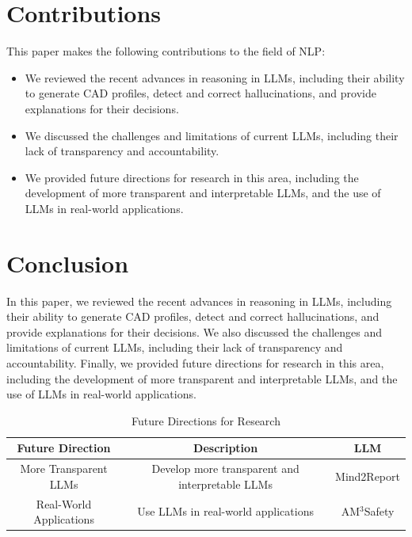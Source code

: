 \documentclass[11pt]{article}
\begin{document}
        \section{Contributions}
        \label{sec:contributions}
        This paper makes the following contributions to the field of NLP:
        \begin{itemize}
        \item We reviewed the recent advances in reasoning in LLMs, including their ability to generate CAD profiles, detect and correct hallucinations, and provide explanations for their decisions.
        \item We discussed the challenges and limitations of current LLMs, including their lack of transparency and accountability.
        \item We provided future directions for research in this area, including the development of more transparent and interpretable LLMs, and the use of LLMs in real-world applications.
        \end{itemize}
        \section{Conclusion}
        \label{sec:conclusion}
        In this paper, we reviewed the recent advances in reasoning in LLMs, including their ability to generate CAD profiles, detect and correct hallucinations, and provide explanations for their decisions. We also discussed the challenges and limitations of current LLMs, including their lack of transparency and accountability. Finally, we provided future directions for research in this area, including the development of more transparent and interpretable LLMs, and the use of LLMs in real-world applications.\\
        \begin{table}[h]
        \centering
        \begin{tabular}{|c|c|c|}
        \hline
        \textbf{Future Direction} & \textbf{Description} & \textbf{LLM} \\
        \hline
        More Transparent LLMs & Develop more transparent and interpretable LLMs & Mind2Report \cite{cheng2026mind2reportcognitivedeepresearch} \\
        \hline
        Real-World Applications & Use LLMs in real-world applications & AM$^3$Safety \cite{zhu2026am3safetydataefficientalignment} \\
        \hline
        \end{tabular}
        \caption{Future Directions for Research}
        \label{tab:future-directions}
        \end{table}
        
\end{document}
